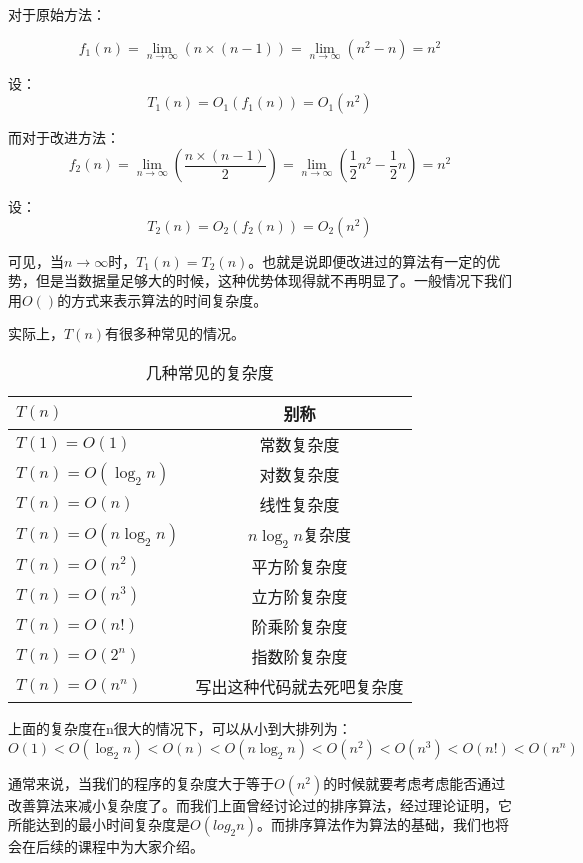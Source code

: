 对于原始方法：

\begin{equation}
f_1(n)=\lim_{n\to\infty}(n\times(n-1))=\lim_{n\to\infty}(n^2-n)=n^2
\end{equation}

设：
\begin{equation}
T_1(n)=O_1(f_1(n))=O_1(n^2)
\end{equation}

而对于改进方法：
\begin{equation}
f_2(n)=\lim_{n\to\infty}(\frac{n\times(n-1)}{2})=\lim_{n\to\infty}(\frac{1}{2}n^2-\frac{1}{2}n)=n^2
\end{equation}

设：
\begin{equation}
T_2(n)=O_2(f_2(n))=O_2(n^2)
\end{equation}

可见，当$n\to\infty$时，$T_1(n)=T_2(n)$。也就是说即便改进过的算法有一定的优势，但是当数据量足够大的时候，这种优势体现得就不再明显了。一般情况下我们用$O()$的方式来表示算法的时间复杂度。

实际上，$T(n)$有很多种常见的情况。

\begin{table}
	\begin{center}	
	\caption{几种常见的复杂度}
	\label{tab:Complexity}
		\begin{tabular}{|l|c|}
			\hline
				$T(n)$ & 别称 \\
			\hline
				$T(1)=O(1)$ & 常数复杂度\\
				$T(n)=O(\log_{2}n)$ & 对数复杂度\\
				$T(n)=O(n)$ & 线性复杂度\\
				$T(n)=O(n\log_{2}n)$ & $n\log_{2}n$复杂度\\
				$T(n)=O(n^2)$ & 平方阶复杂度\\
				$T(n)=O(n^3)$ & 立方阶复杂度\\
				$T(n)=O(n!)$ & 阶乘阶复杂度\\
				$T(n)=O(2^n)$ & 指数阶复杂度\\
				$T(n)=O(n^n)$ & 写出这种代码就去死吧复杂度\\
			\hline
		\end{tabular}
	\end{center}
\end{table}

上面的复杂度在n很大的情况下，可以从小到大排列为：$O(1)<O(\log_{2}n)<O(n)<O(n\log_{2}n)<O(n^2)<O(n^3)<O(n!)<O(n^n)$

通常来说，当我们的程序的复杂度大于等于$O(n^2)$的时候就要考虑考虑能否通过改善算法来减小复杂度了。而我们上面曾经讨论过的排序算法，经过理论证明，它所能达到的最小时间复杂度是$O(log_2⁡n)$。而排序算法作为算法的基础，我们也将会在后续的课程中为大家介绍。


